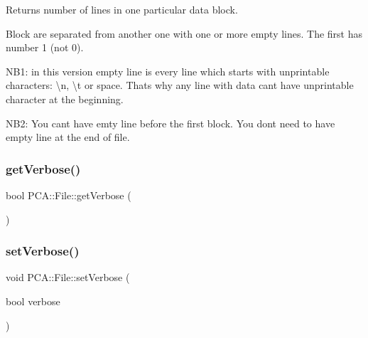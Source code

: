 Returns number of lines in one particular data block. 

Block are separated from another one with one or more empty lines. The first has number 1 (not 0).

N\+B1\+: in this version empty line is every line which starts with unprintable characters\+: \textbackslash{}n, \textbackslash{}t or space. That\textquotesingle{}s why any line with data can\textquotesingle{}t have unprintable character at the beginning.

N\+B2\+: You can\textquotesingle{}t have emty line before the first block. You don\textquotesingle{}t need to have empty line at the end of file. \hypertarget{class_p_c_a_1_1_file_aa080868b37deb641c3369c397f84fd1b}{}\label{class_p_c_a_1_1_file_aa080868b37deb641c3369c397f84fd1b} 
\subsubsection{\texorpdfstring{get\+Verbose()}{getVerbose()}}
{\footnotesize\ttfamily bool P\+C\+A\+::\+File\+::get\+Verbose (\begin{DoxyParamCaption}{ }\end{DoxyParamCaption})\hspace{0.3cm}{\ttfamily [static]}}

\hypertarget{class_p_c_a_1_1_file_a71cb80c09faa4be71eb09ae074aac4b2}{}\label{class_p_c_a_1_1_file_a71cb80c09faa4be71eb09ae074aac4b2} 
\subsubsection{\texorpdfstring{set\+Verbose()}{setVerbose()}}
{\footnotesize\ttfamily void P\+C\+A\+::\+File\+::set\+Verbose (\begin{DoxyParamCaption}\item[{bool}]{verbose }\end{DoxyParamCaption})\hspace{0.3cm}{\ttfamily [static]}}

\hypertarget{class_p_c_a_1_1_file_a25dd7a0266edd1fc026f27448003b36f}{}\label{class_p_c_a_1_1_file_a25dd7a0266edd1fc026f27448003b36f} 
